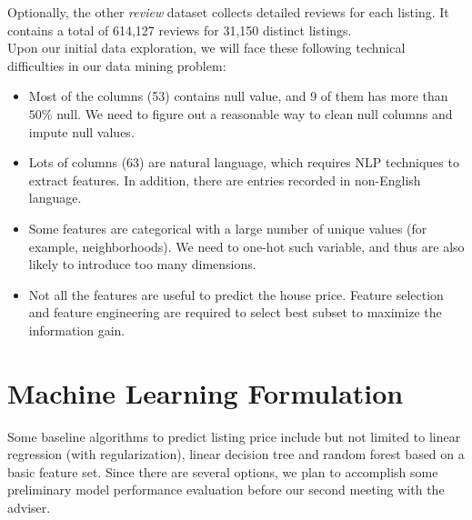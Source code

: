 \documentclass{article}
\begin{document}
	\noindent Optionally, the other \textit{review} dataset collects detailed reviews for each listing. It contains a total of 614,127 reviews for 31,150 distinct listings.\\
	
	\noindent Upon our initial data exploration, we will face these following technical difficulties in our data mining problem:
	\begin{itemize}
		\item Most of the columns (53) contains null value, and 9 of them has more than $50\%$ null. We need to figure out a reasonable way to clean null columns and impute null values.
		\item Lots of columns (63) are natural language, which requires NLP techniques to extract features. In addition, there are entries recorded in non-English language. 
		\item Some features are categorical with a large number of unique values (for example, neighborhoods). We need to one-hot such variable, and thus are also likely to introduce too many dimensions. 
		\item Not all the features are useful to predict the house price. Feature selection and feature engineering are required to select best subset to maximize the information gain. 
	\end{itemize}
	
	\section{Machine Learning Formulation}
	Some baseline algorithms to predict listing price include but not limited to linear regression (with regularization), linear decision tree and random forest based on a basic feature set. Since there are several options, we plan to accomplish some preliminary model performance evaluation before our second meeting with the adviser.
	
\end{document}

